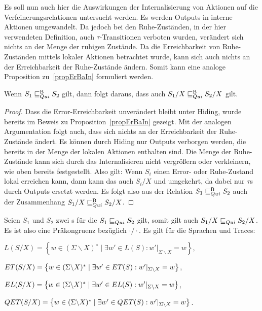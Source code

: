 Es soll nun auch hier die Auswirkungen der Internalisierung von Aktionen auf
die Verfeinerungsrelationen untersucht werden. Es werden Outputs in interne
Aktionen umgewandelt. Da jedoch bei den Ruhe-Zuständen, in der hier verwendeten
Definition, auch
$\tau$-Transitionen verboten wurden, verändert sich nichts an der Menge der
ruhigen Zustände. Da die Erreichbarkeit von Ruhe-Zuständen mittels lokaler
Aktionen betrachtet wurde, kann sich auch nichts an der Erreichbarkeit der
Ruhe-Zustände ändern. Somit kann eine analoge Proposition zu~\ref{propErBaIn}
formuliert werden.

\begin{prop}
  Wenn $S_1\sqsubseteq _{Qui}^\mathrm{B} S_2$ gilt, dann folgt daraus, dass auch $S_1/X\sqsubseteq _{Qui}^\mathrm{B} S_2/X$
  gilt.
\end{prop}

\begin{proof}
  Dass die Error-Erreichbarkeit unverändert bleibt unter Hiding, wurde bereits
  im Beweis zu Proposition~\ref{propErBaIn} gezeigt. Mit der analogen
  Argumentation folgt auch, dass sich nichts an der Erreichbarkeit der
  Ruhe-Zustände ändert. Es können durch Hiding nur Outputs verborgen
  werden, die bereits in der Menge der lokalen Aktionen enthalten sind. Die
  Menge der Ruhe-Zustände kann sich durch das Internalisieren nicht
  vergrößern oder verkleinern, wie oben bereits festgestellt. Also gilt: Wenn
  $S_i$ einen Error- oder Ruhe-Zustand lokal erreichen kann, dann kann das auch
  $S_i/X$ und umgekehrt, da dabei nur $\tau$s durch Outputs ersetzt werden. Es
  folgt also aus der Relation $S_1 \sqsubseteq _{Qui}^\mathrm{B} S_2$ auch der Zusammenhang $S_1/X
  \sqsubseteq _{Qui}^\mathrm{B} S_2/X$.
\end{proof}

\begin{satz}
\label{satzPraeInterQui}
  Seien $S_1$ und $S_2$ zwei \EIO{}s für die $S_1\sqsubseteq _{Qui} S_2$ gilt, somit gilt
  auch $S_1/X\sqsubseteq _{Qui} S_2/X$. Es ist also \QRel{} eine Präkongruenz bezüglich
  $\cdot /\cdot$. Es gilt für die Sprachen und Traces:
  \begin{compactenum}[(i)]
  \item $L(S/X) = \left\{w\in (\Sigma\backslash X){}^*\mid \exists w'\in L(S):
      w'|_{\Sigma\backslash X} = w\right\}$,
    \item $ET{}(S/X) = \left\{w\in (\Sigma\backslash X){}^*\mid \exists
      w'\in ET{}(S): w'|_{\Sigma\backslash X} = w\right\}$,
    \item $EL{}(S/X) = \left\{w\in (\Sigma\backslash X){}^*\mid \exists w'\in
      EL(S): w'|_{\Sigma\backslash X} = w\right\}$,
    \item $QET{}(S/X) = \left\{w\in (\Sigma\backslash X){}^*\mid \exists w'\in
      QET{}(S):w'|_{\Sigma\backslash X}=w\right\}$.
  \end{compactenum}
\end{satz}


